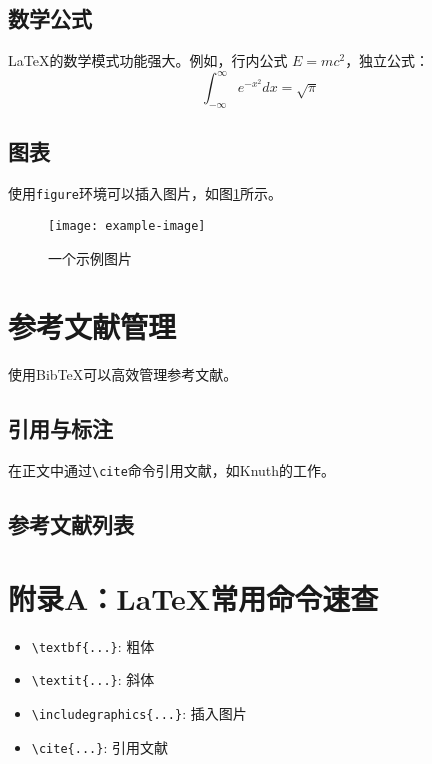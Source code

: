 \documentclass[12pt,a4paper]{report} %
\begin{document}
\section{数学公式}
LaTeX的数学模式功能强大。例如，行内公式 $E = mc^2$，独立公式：
\[
\int_{-\infty}^{\infty} e^{-x^2} dx = \sqrt{\pi}
\]

\section{图表}
使用\texttt{figure}环境可以插入图片，如图\ref{fig:example}所示。
\begin{figure}[htbp]
    \centering
    \texttt{[image: example-image]} %
    \caption{一个示例图片}
    \label{fig:example}
\end{figure}

\chapter{参考文献管理}
使用BibTeX可以高效管理参考文献。

\section{引用与标注}
在正文中通过\texttt{\textbackslash cite}命令引用文献，如Knuth的工作\cite{knuth1984}。

\section{参考文献列表}
\label{sec:ref}


\appendix %
\chapter{附录A：LaTeX常用命令速查}
\begin{itemize}
    \item \texttt{\textbackslash textbf\{...\}}: 粗体
    \item \texttt{\textbackslash textit\{...\}}: 斜体
    \item \texttt{\textbackslash includegraphics\{...\}}: 插入图片
    \item \texttt{\textbackslash cite\{...\}}: 引用文献
\end{itemize}

\backmatter %
\end{document}
